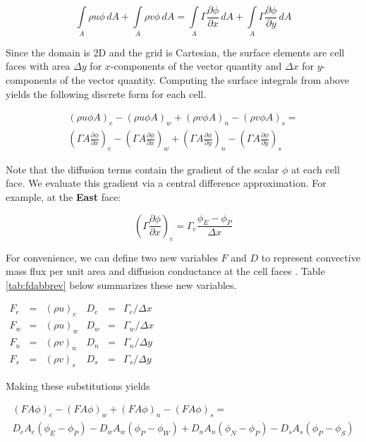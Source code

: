 \documentclass{article}
\newcommand{\dby}[2]{\frac{\partial #1}{\partial #2}}
\newcommand{\intb}[1]{\int\limits_{#1}}
\newcommand{\lp}{\left(}
\newcommand{\rp}{\right)}
\begin{document}
\begin{equation}
    \intb{A} \rho u \phi\,dA + \intb{A} \rho v \phi\,dA = \intb{A} \Gamma \dby{\phi}{x}\,dA + \intb{A} \Gamma \dby{\phi}{y}\,dA
\end{equation}

Since the domain is 2D and the grid is Cartesian, the surface elements are cell faces with area $\Delta y$ for $x$-components of the vector quantity and $\Delta x$ for $y$-components of the vector quantity. Computing the surface integrals from above yields the following discrete form for each cell.

\begin{multline*}
   \lp \rho u \phi A \rp_e - \lp \rho u \phi A \rp_w +
   \lp \rho v \phi A \rp_n - \lp \rho v \phi A \rp_s = \\
   \lp \Gamma A \dby{\phi}{x} \rp_e - \lp \Gamma A \dby{\phi}{x} \rp_w + \lp \Gamma A \dby{\phi}{y} \rp_n - \lp \Gamma A \dby{\phi}{y} \rp_s
\end{multline*}

Note that the diffusion terms contain the gradient of the scalar $\phi$ at each cell face. We evaluate this gradient via a central difference approximation. For example, at the \textbf{East} face:

\begin{equation}
   \lp \Gamma \dby{\phi}{x} \rp_e = \Gamma_e \frac{\phi_E - \phi_P}{\Delta x}
\end{equation}

For convenience, we can define two new variables $F$ and $D$ to represent convective mass flux per unit area and diffusion conductance at the cell faces \cite{introcfdfvm}. Table \ref{tab:fdabbrev} below summarizes these new variables.

\begin{table}[!ht]
\centering
\label{tab:fdabbrev}
$\begin{array}{lcllcl}
     F_e &=& \lp \rho u \rp_e & D_e &=& \Gamma_e/\Delta x \\
     F_w &=& \lp \rho u \rp_w & D_w &=& \Gamma_w/\Delta x \\
     F_n &=& \lp \rho v \rp_n & D_n &=& \Gamma_n/\Delta y \\
     F_s &=& \lp \rho v \rp_s & D_s &=& \Gamma_s/\Delta y
\end{array}$
\end{table}

Making these substitutions yields

\begin{multline}
   \lp FA\phi \rp_e - \lp FA\phi \rp_w + \lp FA\phi \rp_n - \lp FA\phi \rp_s = \\ D_e A_e \lp \phi_E - \phi_P \rp - D_w A_w \lp \phi_P - \phi_W \rp + D_n A_n \lp \phi_N - \phi_P \rp - D_s A_s \lp \phi_P - \phi_S \rp
\end{multline}
\end{document}

